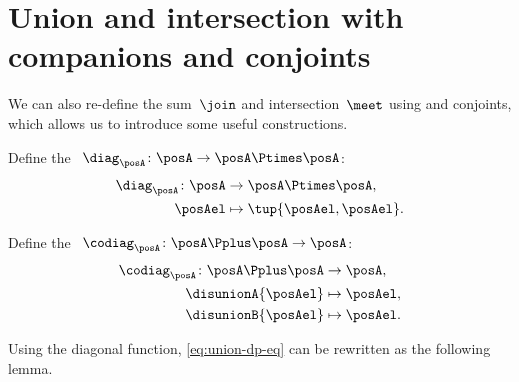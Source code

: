 
\section[Companion and conjoint use]{Union and intersection with companions and conjoints}

We can also re-define the sum~$\join$ and intersection~$\meet$ using  and conjoints, which allows us to introduce some useful constructions.

\begin{definition}
    \label{def:diagonal-function}
    Define the ~$\diag_\posA\colon \posA \to {\posA \Ptimes \posA}$:
    \begin{equation}
        \begin{aligned}
            \diag_\posA \colon \posA & \to {\posA \Ptimes \posA}, \\
            \posAel                  & \mapsto \tup{\posAel, \posAel}.
        \end{aligned}
    \end{equation}
\end{definition}

\begin{definition}
    \label{def:codiagonal-function}
    Define the ~$\codiag_\posA\colon \posA \Pplus \posA \to \posA $:
    \begin{equation}
        \begin{aligned}
            \codiag_\posA \colon \posA \Pplus \posA & \to \posA, \\
            \disunionA{\posAel}                     & \mapsto \posAel, \\
            \disunionB{\posAel}                     & \mapsto \posAel.
        \end{aligned}
    \end{equation}
\end{definition}

Using the diagonal function, \cref{eq:union-dp-eq} can be rewritten as the following lemma.

